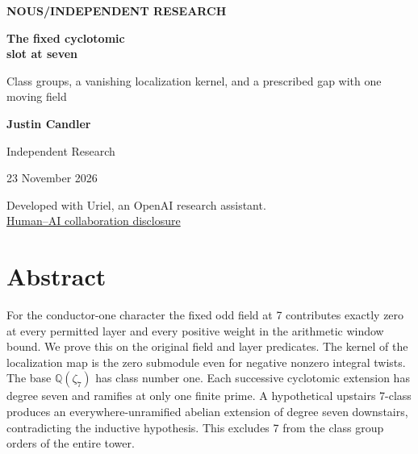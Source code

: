 \documentclass[12pt,letterpaper]{article}
\begin{document}
\thispagestyle{empty}
\vspace*{.12in}
\begin{center}
{\sffamily\small\bfseries\color{accent}NOUS\enspace /\enspace INDEPENDENT RESEARCH}\par
\vspace{.70in}
{\fontsize{30}{35}\selectfont\bfseries\color{ink}The fixed cyclotomic\\slot at seven\par}
\vspace{.23in}
\begin{minipage}{.87\linewidth}\centering
{\Large\color{mute}Class groups, a vanishing localization kernel, and a prescribed gap with one moving field\par}
\end{minipage}\par
\vspace{.50in}
{\large\bfseries Justin Candler}\par
{\small Independent Research}\par
\vspace{.18in}
{\small 23 November 2026}\par
\vspace{.44in}
\par
\end{center}
\vfill
\begin{center}\small
Developed with Uriel, an OpenAI research assistant.\\[2pt]
\hyperref[sec:collaboration]{Human--AI collaboration disclosure}
\end{center}
\clearpage
{}
\section*{Abstract}
For the conductor-one character the fixed odd field at 7 contributes exactly zero at every permitted layer and every positive weight in the arithmetic window bound. We prove this on the original field and layer predicates. The kernel of the localization map is the zero submodule even for negative nonzero integral twists. The base \(\mathbb Q(\zeta_7)\) has class number one. Each successive cyclotomic extension has degree seven and ramifies at only one finite prime. A hypothetical upstairs 7-class produces an everywhere-unramified abelian extension of degree seven downstairs, contradicting the inductive hypothesis. This excludes 7 from the class group orders of the entire tower.
\end{document}
